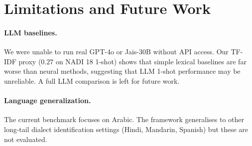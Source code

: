 \documentclass[11pt,a4paper]{article}
\begin{document}
\section{Limitations and Future Work}
\paragraph{LLM baselines.} We were unable to run real GPT-4o or Jais-30B
without API access. Our TF-IDF proxy ($0.27$ on NADI 18 1-shot)
shows that simple lexical baselines are far worse than neural
methods, suggesting that LLM 1-shot performance may be unreliable.
A full LLM comparison is left for future work.

\paragraph{Language generalization.} The current benchmark focuses on
Arabic. The framework generalises to other long-tail dialect
identification settings (Hindi, Mandarin, Spanish) but these are
not evaluated.
\end{document}
